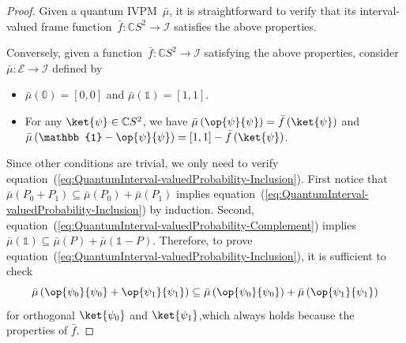 \documentclass[12pt]{iopart}
\theoremstyle{plain}
\theoremstyle{definition}
\theoremstyle{remark}
\newcommand{\events}{\ensuremath{\mathcal{E}}}
\newcommand{\proj}[1]{\op{#1}{#1}}
\begin{document}
\begin{proof} Given a quantum IVPM~$\bar{\mu}$, it is straightforward
to verify that its interval-valued frame function~$\bar{f}:\mathbb{C}S^{2}\rightarrow\mathscr{I}$
satisfies the above properties.

Conversely, given a function~$\bar{f}:\mathbb{C}S^{2}\rightarrow\mathscr{I}$
satisfying the above properties, consider $\bar{\mu}:\events\rightarrow\mathscr{I}$
defined by 
\begin{itemize}
\item $\bar{\mu}(\mathbb{0})=\left[0,0\right]$ and $\bar{\mu}(\mathbb{1})=\left[1,1\right]$. 
\item For any $\ket{\psi}\in\mathbb{C}S^{2}$, we have $\bar{\mu}\left(\proj{\psi}\right)=\bar{f}\left(\ket{\psi}\right)$
and $\bar{\mu}\left(\mathbb{1}-\proj{\psi}\right)=\left[1,1\right]-\bar{f}\left(\ket{\psi}\right)$. 
\end{itemize}
Since other conditions are trivial, we only need to verify equation~(\ref{eq:QuantumInterval-valuedProbability-Inclusion}).
First notice that $\bar{\mu}\left(P_{0}+P_{1}\right)\subseteq\bar{\mu}\left(P_{0}\right)+\bar{\mu}\left(P_{1}\right)$
implies equation~(\ref{eq:QuantumInterval-valuedProbability-Inclusion})
by induction. Second, equation~(\ref{eq:QuantumInterval-valuedProbability-Complement})
implies $\bar{\mu}\left(\mathbb{1}\right)\subseteq\bar{\mu}\left(P\right)+\bar{\mu}\left(\mathbb{1}-P\right)$.
Therefore, to prove equation~(\ref{eq:QuantumInterval-valuedProbability-Inclusion}),
it is sufficient to check 
\begin{equation}
\bar{\mu}\left(\proj{\psi_{0}}+\proj{\psi_{1}}\right)\subseteq\bar{\mu}\left(\proj{\psi_{0}}\right)+\bar{\mu}\left(\proj{\psi_{1}}\right)
\end{equation}
for orthogonal $\ket{\psi_{0}}$ and $\ket{\psi_{1}}$,which always
holds because the properties of $\bar{f}$.\end{proof}
\end{document}

